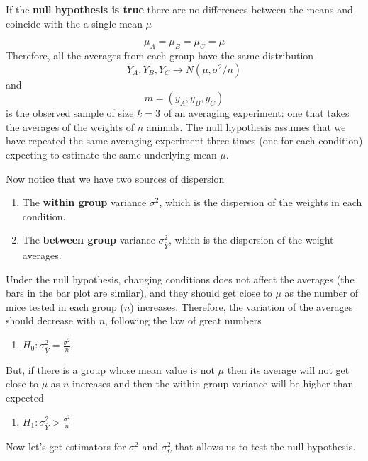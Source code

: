 \documentclass[
]{book}
\providecommand{\tightlist}{%
  \setlength{\itemsep}{0pt}\setlength{\parskip}{0pt}}
\begin{document}
If the \textbf{null hypothesis is true} there are no differences between the means and coincide with the a single mean \(\mu\)

\[\mu_A=\mu_B=\mu_C=\mu\]
Therefore, all the averages from each group have the same distribution \[\bar{Y}_A, \bar{Y}_B, \bar{Y}_C \rightarrow N(\mu, \sigma^2/n)\] and
\[m=(\bar{y}_A, \bar{y}_B, \bar{y}_C )\] is the observed sample of size \(k=3\) of an averaging experiment: one that takes the averages of the weights of \(n\) animals. The null hypothesis assumes that we have repeated the same averaging experiment three times (one for each condition) expecting to estimate the same underlying mean \(\mu\).

Now notice that we have two sources of dispersion

\begin{enumerate}
\def\labelenumi{\arabic{enumi}.}
\item
  The \textbf{within group} variance \(\sigma^2\), which is the dispersion of the weights in each condition.
\item
  The \textbf{between group} variance \(\sigma^2_{\bar{Y}}\), which is the dispersion of the weight averages.
\end{enumerate}

Under the null hypothesis, changing conditions does not affect the averages (the bars in the bar plot are similar), and they should get close to \(\mu\) as the number of mice tested in each group (\(n\)) increases. Therefore, the variation of the averages should decrease with \(n\), following the law of great numbers

\begin{enumerate}
\def\labelenumi{\alph{enumi}.}
\tightlist
\item
  \(H_0: \sigma^2_{\bar{Y}}=\frac{\sigma^2}{n}\)
\end{enumerate}

But, if there is a group whose mean value is not \(\mu\) then its average will not get close to \(\mu\) as \(n\) increases and then the within group variance will be higher than expected

\begin{enumerate}
\def\labelenumi{\alph{enumi}.}
\setcounter{enumi}{1}
\tightlist
\item
  \(H_1: \sigma^2_{\bar{Y}}>\frac{\sigma^2}{n}\)
\end{enumerate}

Now let's get estimators for \(\sigma^2\) and \(\sigma^2_{\bar{Y}}\) that allows us to test the null hypothesis.
\end{document}
